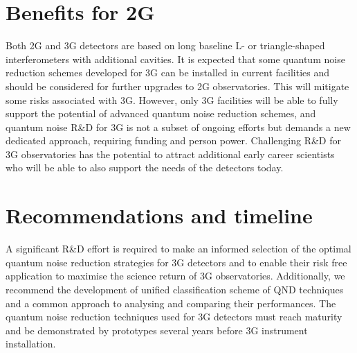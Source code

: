 \section{Benefits for 2G} 
Both 2G and 3G detectors are based on long baseline L- or triangle-shaped interferometers with additional cavities.
It is expected that some quantum noise reduction schemes developed for 3G can be installed in current facilities and should be considered for further upgrades to 2G observatories. This will mitigate some risks associated with 3G. However, only 3G facilities will be able to fully support the potential of advanced quantum noise reduction schemes, and quantum noise R\&D for 3G is not a subset of ongoing efforts but demands a new dedicated approach, requiring funding and person power. Challenging R\&D for 3G observatories has the potential to attract additional early career scientists who will be able to also support the needs of the detectors today. 

\section{Recommendations and timeline}
A significant R\&D effort is required to make an informed selection of the optimal quantum noise reduction strategies for 3G detectors and to enable their risk free application to maximise the science return of 3G observatories. Additionally, we recommend the development of unified classification scheme of QND techniques and a common approach to analysing and comparing their performances. The quantum noise reduction techniques used for 3G detectors must reach maturity and be demonstrated by prototypes several years before 3G instrument installation.  

